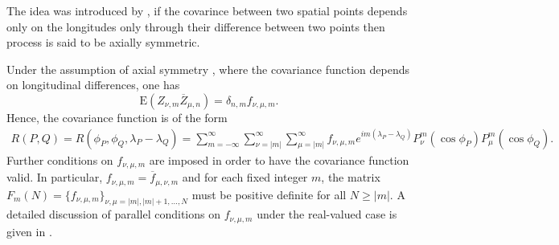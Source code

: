 	The idea was introduced by \cite{Jones1963}, if the covarince between two spatial points depends only on the longitudes only through their difference  between two points then process is said to be axially symmetric.
	
	Under the assumption of axial symmetry , where the covariance function depends on longitudinal differences, one has
	\[
		\mbox{E} (Z_{\nu,m} \overline{Z}_{\mu,n}) = \delta_{n,m} f_{\nu,\mu,m}.
	\]
	Hence, the covariance function is of the form
	\begin{eqnarray} \label{axially-symmetry-cov}
		R(P,Q) = R(\phi_P, \phi_Q, \lambda_P-\lambda_Q) = \sum_{m=-\infty}^{\infty} \sum_{\nu=|m|}^\infty \sum_{\mu=|m|}^\infty f_{\nu,\mu,m} e^{im (\lambda_P-\lambda_Q)} P_{\nu}^m(\cos \phi_P) P_{\mu}^m (\cos \phi_Q).
	\end{eqnarray}
	Further conditions on $f_{\nu,\mu,m}$ are imposed in order to have the covariance function valid. In particular, $f_{\nu,\mu, m} = \overline{f}_{\mu, \nu, m}$ and for each fixed integer $m$, the matrix $F_m(N) = \{ f_{\nu,\mu,m} \}_{\nu,\mu=|m|,|m|+1, \ldots, N }$ must be positive definite for all $N \ge |m|$. A detailed discussion of parallel conditions on $f_{\nu, \mu, m}$ under the real-valued case is given in \cite{Jones1963}.
